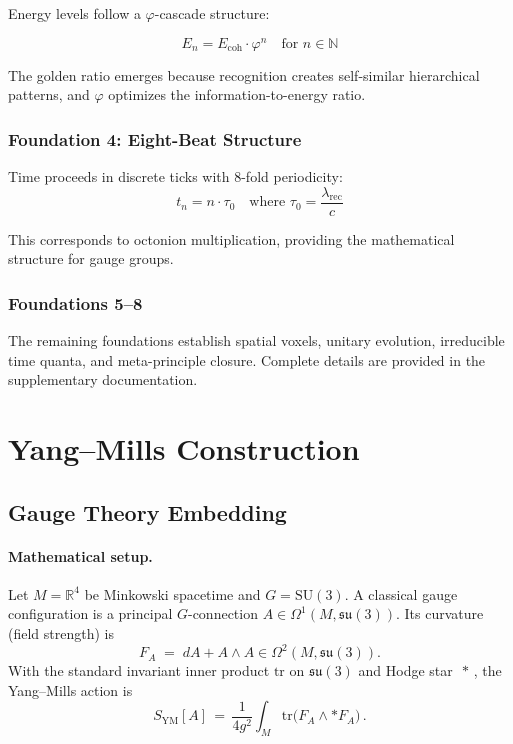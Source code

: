 \documentclass[11pt]{amsart}
\theoremstyle{plain}
\theoremstyle{definition}
\theoremstyle{remark}
\newcommand{\Ecoh}{E_{\text{coh}}}
\newcommand{\lambdarec}{\lambda_{\text{rec}}}
\newcommand{\taunaught}{\tau_0}
\begin{document}
Energy levels follow a $\varphi$-cascade structure:

\begin{equation}
E_n = \Ecoh \cdot \varphi^n \quad \text{for } n \in \mathbb{N}
\end{equation}

The golden ratio emerges because recognition creates self-similar hierarchical patterns, and $\varphi$ optimizes the information-to-energy ratio.

\subsubsection{Foundation 4: Eight-Beat Structure}

Time proceeds in discrete ticks with 8-fold periodicity:
\begin{equation}
t_n = n \cdot \taunaught \quad \text{where } \taunaught = \frac{\lambdarec}{c}
\end{equation}

This corresponds to octonion multiplication, providing the mathematical structure for gauge groups.

\subsubsection{Foundations 5--8}

The remaining foundations establish spatial voxels, unitary evolution, irreducible time quanta, and meta-principle closure. Complete details are provided in the supplementary documentation.

\section{Yang--Mills Construction}

\subsection{Gauge Theory Embedding}

\paragraph{Mathematical setup.} Let $M=\mathbb R^4$ be Minkowski spacetime and $G=\mathrm{SU}(3)$. A classical gauge configuration is a principal $G$-connection $A\in\Omega^1(M,\mathfrak{su}(3))$. Its curvature (field strength) is
\[
F_A \;=\; dA + A\wedge A \in \Omega^2(M,\mathfrak{su}(3)).
\]
With the standard invariant inner product $\mathrm{tr}$ on $\mathfrak{su}(3)$ and Hodge star $\,*\,$, the Yang--Mills action is
\[
S_{\mathrm{YM}}[A] \,=\, \frac{1}{4g^2}\int_M \mathrm{tr}\big(F_A \wedge *F_A\big) \,.
\]
\end{document}
